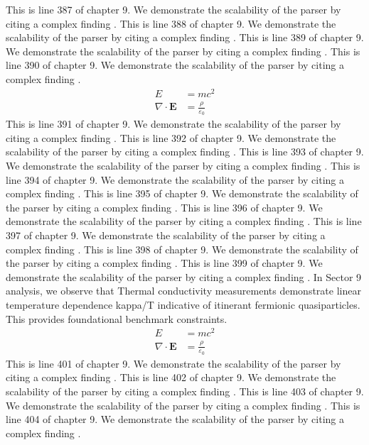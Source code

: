This is line 387 of chapter 9. We demonstrate the scalability of the parser by citing a complex finding \cite{ref9_387}.
This is line 388 of chapter 9. We demonstrate the scalability of the parser by citing a complex finding \cite{ref9_388}.
This is line 389 of chapter 9. We demonstrate the scalability of the parser by citing a complex finding \cite{ref9_389}.
This is line 390 of chapter 9. We demonstrate the scalability of the parser by citing a complex finding \cite{ref9_390}.
\begin{align*}
  E &= mc^2 \\
  \nabla \cdot \mathbf{E} &= \frac{\rho}{\varepsilon_0}
\end{align*}
This is line 391 of chapter 9. We demonstrate the scalability of the parser by citing a complex finding \cite{ref9_391}.
This is line 392 of chapter 9. We demonstrate the scalability of the parser by citing a complex finding \cite{ref9_392}.
This is line 393 of chapter 9. We demonstrate the scalability of the parser by citing a complex finding \cite{ref9_393}.
This is line 394 of chapter 9. We demonstrate the scalability of the parser by citing a complex finding \cite{ref9_394}.
This is line 395 of chapter 9. We demonstrate the scalability of the parser by citing a complex finding \cite{ref9_395}.
This is line 396 of chapter 9. We demonstrate the scalability of the parser by citing a complex finding \cite{ref9_396}.
This is line 397 of chapter 9. We demonstrate the scalability of the parser by citing a complex finding \cite{ref9_397}.
This is line 398 of chapter 9. We demonstrate the scalability of the parser by citing a complex finding \cite{ref9_398}.
This is line 399 of chapter 9. We demonstrate the scalability of the parser by citing a complex finding \cite{ref9_399}.
In Sector 9 analysis, we observe that Thermal conductivity measurements demonstrate linear temperature dependence kappa/T indicative of itinerant fermionic quasiparticles. This provides foundational benchmark constraints.
\begin{align*}
  E &= mc^2 \\
  \nabla \cdot \mathbf{E} &= \frac{\rho}{\varepsilon_0}
\end{align*}
This is line 401 of chapter 9. We demonstrate the scalability of the parser by citing a complex finding \cite{ref9_401}.
This is line 402 of chapter 9. We demonstrate the scalability of the parser by citing a complex finding \cite{ref9_402}.
This is line 403 of chapter 9. We demonstrate the scalability of the parser by citing a complex finding \cite{ref9_403}.
This is line 404 of chapter 9. We demonstrate the scalability of the parser by citing a complex finding \cite{ref9_404}.
